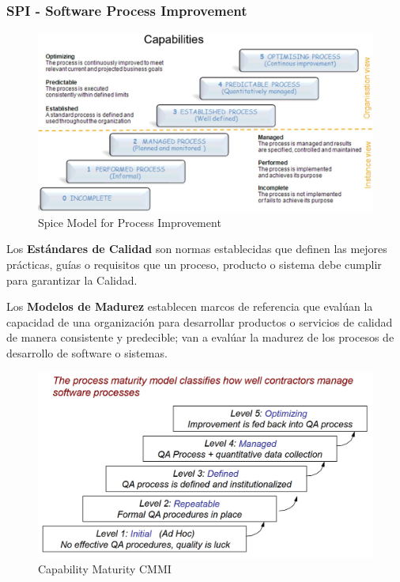 \subsubsection{SPI - Software Process Improvement}

\begin{figure}[htbp]
   \centering
   \includegraphics{images/01/spice.png}
   \caption{Spice Model for Process Improvement}
   \label{fig:01/spice}
\end{figure}

\begin{paracol}{2}
   \colfill
   Los \textbf{Estándares de Calidad} son normas establecidas que definen las mejores prácticas, guías o requisitos que un proceso, producto o sistema debe cumplir para garantizar la Calidad.

   Los \textbf{Modelos de Madurez} establecen marcos de referencia que evalúan la capacidad de una organización para desarrollar productos o servicios de calidad de manera consistente y predecible; van a evalúar la madurez de los procesos de desarrollo de software o sistemas.
   \colfill
   
   \switchcolumn

   \begin{figure}[htbp]
      \centering
      \includegraphics[width=0.5\columnwidth]{images/01/madurez.png}
      \caption{Capability Maturity CMMI}
      \label{fig:01/madurez}
   \end{figure}

\end{paracol}

